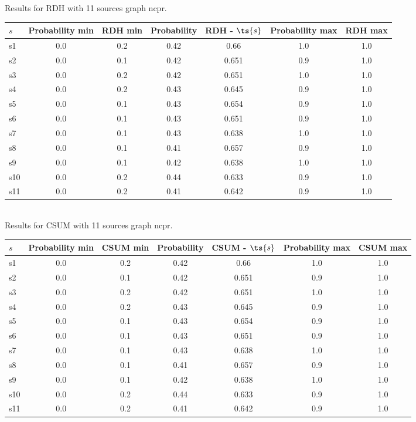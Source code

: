 \documentclass{article}
\begin{document}
\noindent Results for RDH with 11 sources graph ncpr.

\noindent\begin{tabular}{|l|c|c|c|c|c|c|}
\hline
$s$& Probability min & RDH min & Probability & RDH - $\ts{s}$ & Probability max & RDH max\\
\hline
s1 &0.0 & 0.2 & 0.42 & 0.66 & 1.0 & 1.0\\
\hline
s2 &0.0 & 0.1 & 0.42 & 0.651 & 0.9 & 1.0\\
\hline
s3 &0.0 & 0.2 & 0.42 & 0.651 & 1.0 & 1.0\\
\hline
s4 &0.0 & 0.2 & 0.43 & 0.645 & 0.9 & 1.0\\
\hline
s5 &0.0 & 0.1 & 0.43 & 0.654 & 0.9 & 1.0\\
\hline
s6 &0.0 & 0.1 & 0.43 & 0.651 & 0.9 & 1.0\\
\hline
s7 &0.0 & 0.1 & 0.43 & 0.638 & 1.0 & 1.0\\
\hline
s8 &0.0 & 0.1 & 0.41 & 0.657 & 0.9 & 1.0\\
\hline
s9 &0.0 & 0.1 & 0.42 & 0.638 & 1.0 & 1.0\\
\hline
s10 &0.0 & 0.2 & 0.44 & 0.633 & 0.9 & 1.0\\
\hline
s11 &0.0 & 0.2 & 0.41 & 0.642 & 0.9 & 1.0\\
\hline
\end{tabular}\\

\noindent Results for CSUM with 11 sources graph ncpr.

\noindent\begin{tabular}{|l|c|c|c|c|c|c|}
\hline
$s$& Probability min & CSUM min & Probability & CSUM - $\ts{s}$ & Probability max & CSUM max\\
\hline
s1 &0.0 & 0.2 & 0.42 & 0.66 & 1.0 & 1.0\\
\hline
s2 &0.0 & 0.1 & 0.42 & 0.651 & 0.9 & 1.0\\
\hline
s3 &0.0 & 0.2 & 0.42 & 0.651 & 1.0 & 1.0\\
\hline
s4 &0.0 & 0.2 & 0.43 & 0.645 & 0.9 & 1.0\\
\hline
s5 &0.0 & 0.1 & 0.43 & 0.654 & 0.9 & 1.0\\
\hline
s6 &0.0 & 0.1 & 0.43 & 0.651 & 0.9 & 1.0\\
\hline
s7 &0.0 & 0.1 & 0.43 & 0.638 & 1.0 & 1.0\\
\hline
s8 &0.0 & 0.1 & 0.41 & 0.657 & 0.9 & 1.0\\
\hline
s9 &0.0 & 0.1 & 0.42 & 0.638 & 1.0 & 1.0\\
\hline
s10 &0.0 & 0.2 & 0.44 & 0.633 & 0.9 & 1.0\\
\hline
s11 &0.0 & 0.2 & 0.41 & 0.642 & 0.9 & 1.0\\
\hline
\end{tabular}\\
\end{document}
